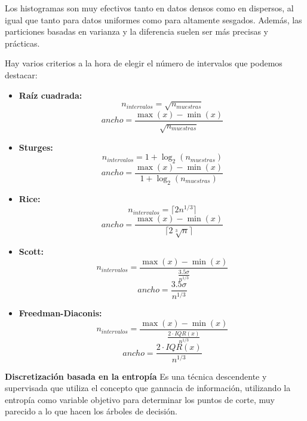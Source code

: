 \documentclass[12pt, letterpaper]{article}
\begin{document}
Los histogramas son muy efectivos tanto en datos densos como en dispersos, al igual que tanto para datos uniformes como para altamente sesgados. Además, las particiones basadas en varianza y la diferencia suelen ser más precisas y prácticas.

Hay varios criterios a la hora de elegir el número de intervalos que podemos destacar:
\begin{itemize}
    \item \textbf{Raíz cuadrada:}
    \[
        n_{intervalos} = \sqrt{n_{muestras}}
    \]
    \[
        ancho = \frac{\max(x) - \min(x)}{\sqrt{n_{muestras}}}
    \]

    \item \textbf{Sturges:}
    \[
        n_{intervalos} = 1 + \log_2(n_{muestras})
    \]
    \[
        ancho = \frac{\max(x) - \min(x)}{1 + \log_2(n_{muestras})}
    \]

    \item \textbf{Rice:}
    \[
        n_{intervalos} = \lceil 2n^{1/3} \rceil   \]
    \[
        ancho = \frac{\max(x) - \min(x)}{\lceil 2\sqrt[3]{n} \rceil}
    \]

    \item \textbf{Scott:}
    \[
        n_{intervalos} = \frac{\max(x) - \min(x)}{\frac{3.5\sigma}{n^{1/3}}}
    \]
    \[
        ancho = \frac{3.5\sigma}{n^{1/3}}
    \]

    \item \textbf{Freedman-Diaconis:}
    \[
        n_{intervalos} = \frac{\max(x) - \min(x)}{\frac{2 \cdot IQR(x)}{n^{1/3}}}
    \]
    \[
        ancho = \frac{2 \cdot IQR(x)}{n^{1/3}}
    \]
\end{itemize}

\vspace{1 em}
\textbf{Discretización basada en la entropía}
Es una técnica descendente y supervisada que utiliza el concepto que gannacia de información, utilizando la entropía como variable objetivo para determinar los puntos de corte, muy parecido a lo que hacen los árboles de decisión.
\end{document}
